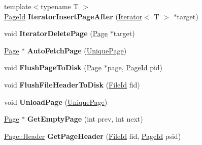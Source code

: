 \begin{DoxyCompactItemize}
\item 
\mbox{\label{class_buffer_manager_abd7effc6301c9a022b8d19b40c106c73}} 
{\footnotesize template$<$typename T $>$ }\\\mbox{\hyperlink{struct_generic_i_o_id}{Page\+Id}} {\bfseries Iterator\+Insert\+Page\+After} (\mbox{\hyperlink{class_buffer_manager_1_1_iterator}{Iterator}}$<$ T $>$ $\ast$target)
\item 
\mbox{\label{class_buffer_manager_ae745995d49f0d07e5c8e14ed3f876a55}} 
void {\bfseries Iterator\+Delete\+Page} (\mbox{\hyperlink{struct_page}{Page}} $\ast$target)
\item 
\mbox{\label{class_buffer_manager_af7cd0ce8c0ec727c21fced195f2be157}} 
\mbox{\hyperlink{struct_page}{Page}} $\ast$ {\bfseries Auto\+Fetch\+Page} (\mbox{\hyperlink{struct_buffer_manager_1_1_unique_page}{Unique\+Page}})
\item 
\mbox{\label{class_buffer_manager_af796267f9111e1240fd1b01441459456}} 
void {\bfseries Flush\+Page\+To\+Disk} (\mbox{\hyperlink{struct_page}{Page}} $\ast$page, \mbox{\hyperlink{struct_generic_i_o_id}{Page\+Id}} pid)
\item 
\mbox{\label{class_buffer_manager_a909cda1c5cc52fb8a32ac24c382d09c3}} 
void {\bfseries Flush\+File\+Header\+To\+Disk} (\mbox{\hyperlink{struct_generic_i_o_id}{File\+Id}} fid)
\item 
\mbox{\label{class_buffer_manager_ac1f0a593fd8605be8f2de406a28f6205}} 
void {\bfseries Unload\+Page} (\mbox{\hyperlink{struct_buffer_manager_1_1_unique_page}{Unique\+Page}})
\item 
\mbox{\label{class_buffer_manager_a572f8d37bdfc1d325e977241fcbd504f}} 
\mbox{\hyperlink{struct_page}{Page}} $\ast$ {\bfseries Get\+Empty\+Page} (int prev, int next)
\item 
\mbox{\label{class_buffer_manager_aa6f56da237d614e4f7b60d832923ca92}} 
\mbox{\hyperlink{struct_page_1_1_header}{Page\+::\+Header}} {\bfseries Get\+Page\+Header} (\mbox{\hyperlink{struct_generic_i_o_id}{File\+Id}} fid, \mbox{\hyperlink{struct_generic_i_o_id}{Page\+Id}} psid)
\end{DoxyCompactItemize}


